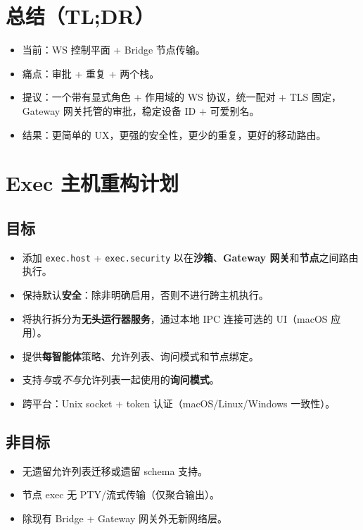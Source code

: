 \hrulefill


\section{总结（TL;DR）}


\begin{itemize}
  \item 当前：WS 控制平面 + Bridge 节点传输。
  \item 痛点：审批 + 重复 + 两个栈。
  \item 提议：一个带有显式角色 + 作用域的 WS 协议，统一配对 + TLS 固定，Gateway 网关托管的审批，稳定设备 ID + 可爱别名。
  \item 结果：更简单的 UX，更强的安全性，更少的重复，更好的移动路由。
\end{itemize}



\clearpage

\section{Exec 主机重构计划}


\subsection{目标}


\begin{itemize}
  \item 添加 \texttt{exec.host} + \texttt{exec.security} 以在\textbf{沙箱}、\textbf{Gateway 网关}和\textbf{节点}之间路由执行。
  \item 保持默认\textbf{安全}：除非明确启用，否则不进行跨主机执行。
  \item 将执行拆分为\textbf{无头运行器服务}，通过本地 IPC 连接可选的 UI（macOS 应用）。
  \item 提供\textbf{每智能体}策略、允许列表、询问模式和节点绑定。
  \item 支持\textit{与}或\textit{不与}允许列表一起使用的\textbf{询问模式}。
  \item 跨平台：Unix socket + token 认证（macOS/Linux/Windows 一致性）。
\end{itemize}


\subsection{非目标}


\begin{itemize}
  \item 无遗留允许列表迁移或遗留 schema 支持。
  \item 节点 exec 无 PTY/流式传输（仅聚合输出）。
  \item 除现有 Bridge + Gateway 网关外无新网络层。
\end{itemize}


